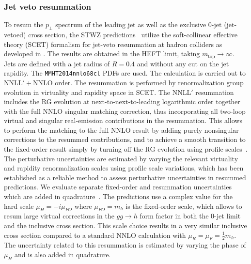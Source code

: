 \subsubsection{Jet veto resummation}
\label{sec:hjetscomp:tools:ares:jvres}

To resum the $p_\perp$ spectrum of the leading jet as well as the exclusive $0$-jet
(jet-vetoed) cross section, the STWZ predictions~\cite{Stewart:2013faa} utilize
the soft-collinear effective theory (SCET) formalism for jet-veto resummation at
hadron colliders as developed in \cite{Stewart:2009yx, Berger:2010xi,
Tackmann:2012bt, Stewart:2013faa}. The results are obtained in the HEFT 
limit, taking $m_\text{top}\to\infty$.
Jets are defined with a jet radius of $R = 0.4$ and without any cut on the jet
rapidity. The \texttt{MMHT2014nnlo68cl} PDFs are used. The calculation is carried out to
NNLL$'+$NNLO order. The resummation is performed by renormalization group
evolution in virtuality and rapidity space in SCET. The NNLL$'$ resummation
includes the RG evolution at next-to-next-to-leading logarithmic order together
with the full NNLO singular matching correction, thus incorporating all two-loop
virtual and singular real-emission contributions in the resummation. This allows
to perform the matching to the full NNLO result by adding purely nonsingular
corrections to the resummed contributions, and to achieve a smooth transition to
the fixed-order result simply by turning off the RG evolution using profile
scales~\cite{Ligeti:2008ac, Abbate:2010xh}. The perturbative uncertainties are
estimated by varying the relevant virtuality and rapidity renormalization scales
using profile scale variations, which has been established as a reliable method
to assess perturbative uncertainties in resummed predictions. We evaluate
separate fixed-order and resummation uncertainties which are added in
quadrature~\cite{Berger:2010xi, Stewart:2011cf, Stewart:2013faa}.
The predictions use a complex value for the hard scale $\mu_H = -i \mu_{FO}$ where
$\mu_{FO} = m_h$ is the fixed-order scale, which allows to resum large virtual
corrections in the $gg\to h$ form factor in both the 0-jet limit and the
inclusive cross section. This scale choice results in a very similar 
inclusive cross section compared to a standard NNLO calculation with 
$\mu_R=\mu_F=\tfrac{1}{2}m_h$. The uncertainty related to this resummation is
estimated by varying the phase of $\mu_H$ and is also added in quadrature.

